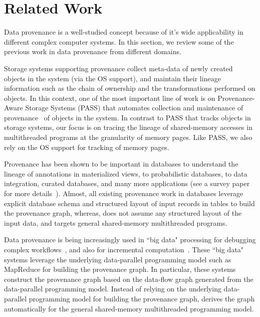 \section{Related Work}
\label{sec:related}

Data provenance is a well-studied concept because of it's wide applicability in different complex computer systems. In this section, we review some of the previous work in data provenance from different domains.



 Storage systems supporting provenance collect meta-data of newly created objects in the system (via the OS support), and  maintain their lineage information such as the chain of ownership and the transformations performed on objects. In this context, one of the most important line of work is on Provenance-Aware Storage Systems (PASS) that automates collection and maintenance of provenance~\cite{pass-atc} of objects in the system. %
In contrast to PASS that tracks objects in storage systems, our focus is on tracing the lineage of shared-memory accesses in multithreaded programs at the granularity of memory pages. Like PASS, we also rely on the OS support for tracking of memory pages.


 Provenance has been shown to be important in databases to understand the lineage of annotations in materialized views,  to probabilistic databases, to data integration, curated databases, and many more applications (see a survey paper for more details~\cite{provenance-database-tutorial}). Almost, all existing provenance work in databases leverage explicit database schema and structured layout of input records in tables to build the provenance graph, whereas, \projecttitle does not assume any structured layout of the input data, and targets general shared-memory multithreaded programs.

 
 Data provenance is being increasingly used in ``big data"  processing for  debugging complex workflows~\cite{nova}, and also for incremental computation~\cite{incoop}.  These ``big data" systems leverage the underlying data-parallel programming model such as MapReduce for building the provenance graph. In particular, these systems construct the provenance graph based on the data-flow graph generated from the data-parallel programming model. Instead of relying on the underlying data-parallel programming model for building the provenance graph,  \projecttitle derives the graph automatically for the general shared-memory multithreaded programming model. 


